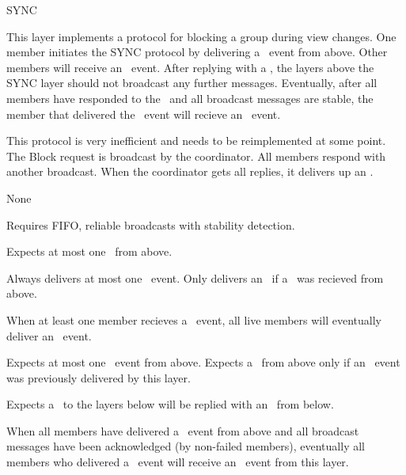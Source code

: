 %
%
%
\begin{Layer}{SYNC}

This layer implements a protocol for blocking a group during view changes.  One
member initiates the SYNC protocol by delivering a \DnBlock\ event from above.
Other members will receive an \UpBlock\ event.  After replying with a
\DnBlockOk, the layers above the SYNC layer should not broadcast any further
messages.  Eventually, after all members have responded to the \UpBlock\ and
all broadcast messages are stable, the member that delivered the \DnBlock\
event will recieve an \UpBlockOk\ event.

\begin{Protocol}
This protocol is very inefficient and needs to be reimplemented at some
point.  The Block request is broadcast by the coordinator.  All members
respond with another broadcast.  When the coordinator gets all replies, it
delivers up an \UpBlockOk.
\end{Protocol}

\begin{Parameters}
\item None
\end{Parameters}

\begin{Properties}
\item
Requires FIFO, reliable broadcasts with stability detection.
\item
Expects at most one \DnBlock\ from above.
\item
Always delivers at most one \UpBlockOk\ event.  Only delivers an \UpBlockOk\ if
a \DnBlock\ was recieved from above.
\item
When at least one member recieves a \DnBlock\ event, all live members will
eventually deliver an \UpBlock\ event.
\item
Expects at most one \DnBlockOk\ event from above.  Expects a \DnBlockOk\ from
above only if an \UpBlock\ event was previously delivered by this layer.
\item
Expects a \DnBlock\ to the layers below will be replied with an \UpBlock\ from
below.
\item
When all members have delivered a \DnBlockOk\ event from above and all
broadcast messages have been acknowledged (by non-failed members),
eventually all members who delivered a \DnBlock\ event will receive an
\UpBlockOk\ event from this layer.
\end{Properties}


\end{Layer}
